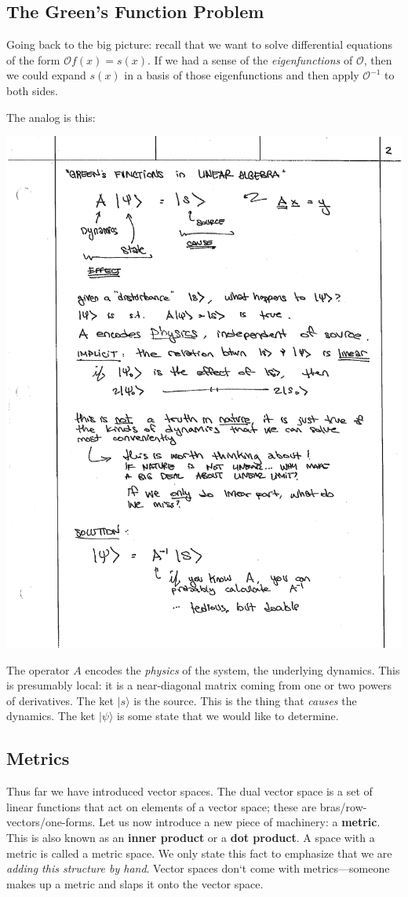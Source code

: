 \documentclass[12pt]{article}
\numberwithin{equation}{section}    %
\begin{document}
\subsection{The Green’s Function Problem}

Going back to the big picture: recall that we want to solve differential equations of the form $\mathcal O f(x) = s(x)$. If we had a sense of the \emph{eigenfunctions} of $\mathcal O$, then we could expand $s(x)$ in a basis of those eigenfunctions and then apply $\mathcal O^{-1}$ to both sides. 

The analog is this:

\begin{center}
\includegraphics[width=.7\textwidth]{figures/lec02_green01.pdf}
\end{center}

The operator $A$ encodes the \emph{physics} of the system, the underlying dynamics.
%
This is presumably local: it is a near-diagonal matrix coming from one or two powers of derivatives.  The ket $|s\rangle$ is the source. This is the thing that \emph{causes} the dynamics. The ket $|\psi\rangle$ is some state that we would like to determine. 

\subsection{Metrics}

Thus far we have introduced vector spaces. The dual vector space is a set of linear functions that act on elements of a vector space; these are bras/row-vectors/one-forms. Let us now introduce a new piece of machinery: a \textbf{metric}. This is also known as an \textbf{inner product} or a \textbf{dot product}. A space with a metric is called a metric space. We only state this fact to emphasize that we are \emph{adding this structure by hand}. Vector spaces don‘t come with metrics---someone makes up a metric and slaps it onto the vector space.
\end{document}
